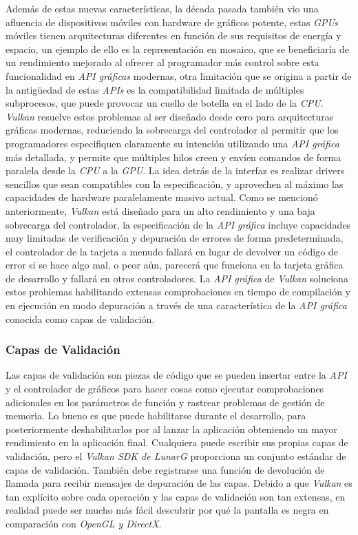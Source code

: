 \documentclass[a4paper]{book}
\begin{document}
Además de estas nuevas características, la década pasada también vio una afluencia de dispositivos
móviles con hardware de gráficos potente, estas \textit{GPUs} móviles tienen arquitecturas diferentes en función de sus requisitos de
energía y espacio, un ejemplo de ello es la representación en mosaico, que se beneficiaría de un rendimiento mejorado al ofrecer al
programador más control sobre esta funcionalidad en \textit{API gráficas} modernas, otra limitación que se origina a partir de la antigüedad
de estas \textit{APIs} es la compatibilidad limitada de múltiples subprocesos, que puede provocar un cuello de botella en el lado de la
\textit{CPU}. \textit{Vulkan} resuelve estos problemas al ser diseñado desde cero para arquitecturas gráficas modernas, reduciendo la sobrecarga
del controlador al permitir que los programadores especifiquen claramente su intención utilizando una \textit{API gráfica} más detallada,
y permite que múltiples hilos creen y envíen comandos de forma paralela desde la \textit{CPU} a la \textit{GPU}. La idea detrás de la interfaz
es realizar drivers sencillos que sean compatibles con la especificación, y aprovechen al máximo las capacidades de hardware paralelamente
masivo actual. Como se mencionó anteriormente, \textit{Vulkan} está diseñado para un alto rendimiento y una baja sobrecarga del controlador, la 
especificación de la \textit{API gráfica} incluye capacidades muy limitadas de verificación y depuración de errores de forma predeterminada,
el controlador de la tarjeta a menudo fallará en lugar de devolver un código de error si se hace algo mal, o peor aún, parecerá que
funciona en la tarjeta gráfica de desarrollo y fallará en otros controladores. La \textit{API gráfica} de \textit{Vulkan} soluciona estos problemas 
habilitando extensas comprobaciones en tiempo de compilación y en ejecución en modo depuración a través de una característica de la 
\textit{API gráfica} conocida como capas de validación.

\subsubsection{Capas de Validación}
\label{subsec:CapsVulkan}

Las capas de validación son piezas de código que se pueden insertar entre la \textit{API} y el controlador de gráficos
para hacer cosas como ejecutar comprobaciones adicionales en los parámetros de función y rastrear problemas
de gestión de memoria. Lo bueno es que puede habilitarse durante el desarrollo, para posteriormente deshabilitarlos por
al lanzar la aplicación obteniendo un mayor rendimiento en la aplicación final. Cualquiera puede escribir sus propias capas de validación,
pero el \textit{Vulkan SDK de LunarG} proporciona un conjunto estándar de capas de validación. También debe registrarse
una función de devolución de llamada para recibir mensajes de depuración de las capas. Debido a que \textit{Vulkan} es tan explícito
sobre cada operación y las capas de validación son tan extensas, en realidad puede ser mucho más fácil descubrir por qué la pantalla
es negra en comparación con \textit{OpenGL y DirectX}.
\end{document}
